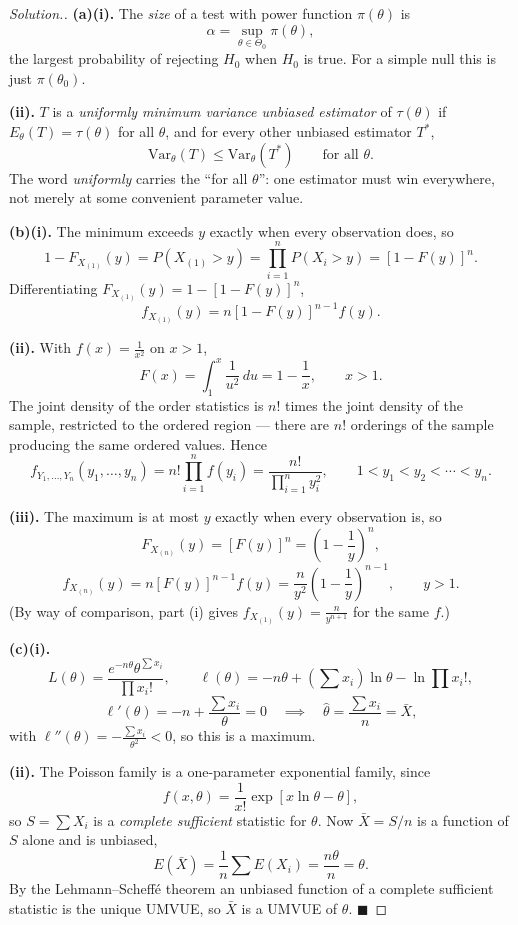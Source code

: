 \documentclass[12pt,a4paper]{report}
\theoremstyle{definition}
\theoremstyle{plain}
\newenvironment{solution}
  {\renewcommand{\qedsymbol}{}\begin{proof}[\textit{Solution}.]}
  {\end{proof}}
\begin{document}
\begin{solution}
\textbf{(a)(i).} The \emph{size} of a test with power function $\pi(\theta)$ is
\[\alpha=\sup_{\theta\in\Theta_0}\pi(\theta),\]
the largest probability of rejecting $H_0$ when $H_0$ is true. For a simple null
this is just $\pi(\theta_0)$.

\textbf{(ii).} $T$ is a \emph{uniformly minimum variance unbiased estimator} of
$\tau(\theta)$ if $E_\theta(T)=\tau(\theta)$ for all $\theta$, and for every other
unbiased estimator $T^*$,
\[\text{Var}_\theta(T)\leq\text{Var}_\theta\left(T^*\right)
\qquad\text{for all }\theta.\]
The word \emph{uniformly} carries the ``for all $\theta$'': one estimator must win
everywhere, not merely at some convenient parameter value.

\textbf{(b)(i).} The minimum exceeds $y$ exactly when every observation does, so
\[1-F_{X_{(1)}}(y)=P\left(X_{(1)}>y\right)=\prod_{i=1}^nP(X_i>y)
=\left[1-F(y)\right]^n.\]
Differentiating $F_{X_{(1)}}(y)=1-\left[1-F(y)\right]^n$,
\[f_{X_{(1)}}(y)=n\left[1-F(y)\right]^{n-1}f(y).\]

\textbf{(ii).} With $f(x)=\frac{1}{x^2}$ on $x>1$,
\[F(x)=\int_1^x\frac{1}{u^2}\,du=1-\frac{1}{x},\qquad x>1.\]
The joint density of the order statistics is $n!$ times the joint density of the
sample, restricted to the ordered region --- there are $n!$ orderings of the
sample producing the same ordered values. Hence
\[f_{Y_1,\ldots,Y_n}(y_1,\ldots,y_n)=n!\prod_{i=1}^nf(y_i)
=\frac{n!}{\prod_{i=1}^ny_i^2},\qquad 1<y_1<y_2<\cdots<y_n.\]

\textbf{(iii).} The maximum is at most $y$ exactly when every observation is, so
\[F_{X_{(n)}}(y)=\left[F(y)\right]^n=\left(1-\frac{1}{y}\right)^n,\]
\[f_{X_{(n)}}(y)=n\left[F(y)\right]^{n-1}f(y)
=\frac{n}{y^2}\left(1-\frac{1}{y}\right)^{n-1},\qquad y>1.\]
(By way of comparison, part (i) gives
$f_{X_{(1)}}(y)=\frac{n}{y^{n+1}}$ for the same $f$.)

\textbf{(c)(i).}
\[L(\theta)=\frac{e^{-n\theta}\theta^{\sum x_i}}{\prod x_i!},\qquad
\ell(\theta)=-n\theta+\left(\sum x_i\right)\ln\theta-\ln\prod x_i!,\]
\[\ell'(\theta)=-n+\frac{\sum x_i}{\theta}=0
\quad\implies\quad\hat\theta=\frac{\sum x_i}{n}=\bar X,\]
with $\ell''(\theta)=-\frac{\sum x_i}{\theta^2}<0$, so this is a maximum.

\textbf{(ii).} The Poisson family is a one-parameter exponential family, since
\[f(x,\theta)=\frac{1}{x!}\exp\left[x\ln\theta-\theta\right],\]
so $S=\sum X_i$ is a \emph{complete sufficient} statistic for $\theta$. Now
$\bar X=S/n$ is a function of $S$ alone and is unbiased,
\[E\left(\bar X\right)=\frac{1}{n}\sum E(X_i)=\frac{n\theta}{n}=\theta.\]
By the Lehmann--Scheff\'e theorem an unbiased function of a complete sufficient
statistic is the unique UMVUE, so $\bar X$ is a UMVUE of $\theta$.
$\blacksquare$


\end{solution}
\end{document}
